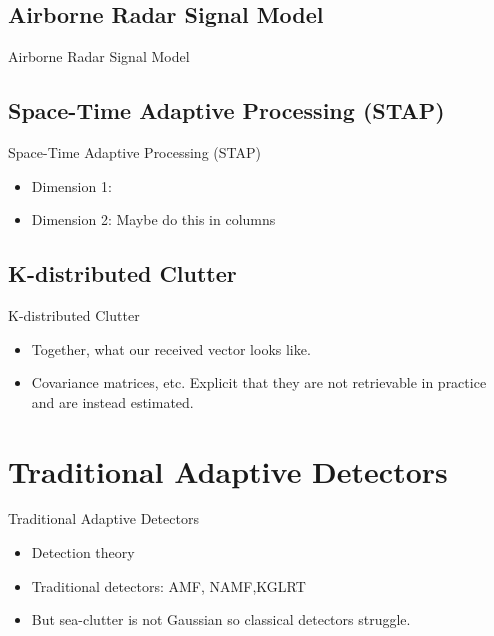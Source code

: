 \documentclass{beamer}
\begin{document}
\subsection{Airborne Radar Signal Model}
\begin{frame}{Airborne Radar Signal Model}
    
\end{frame}

\subsection{Space-Time Adaptive Processing (STAP)}
\begin{frame}{Space-Time Adaptive Processing (STAP)}
    \begin{itemize}
        \item Dimension 1:
        \item Dimension 2: Maybe do this in columns \cite{Aboutanios2020}
    \end{itemize}
\end{frame}

\subsection{K-distributed Clutter}
\begin{frame}{K-distributed Clutter}
    \begin{itemize}
        \item Together, what our received vector looks like.
        \item Covariance matrices, etc. Explicit that they are not retrievable in practice and are instead estimated.
    \end{itemize}
\end{frame}

\section{Traditional Adaptive Detectors}
\begin{frame}{Traditional Adaptive Detectors}
    \begin{itemize}
        \item Detection theory
        \item Traditional detectors: AMF, NAMF,KGLRT
        \item But sea-clutter is not Gaussian so classical detectors struggle.
    \end{itemize}
\end{frame}
\end{document}
